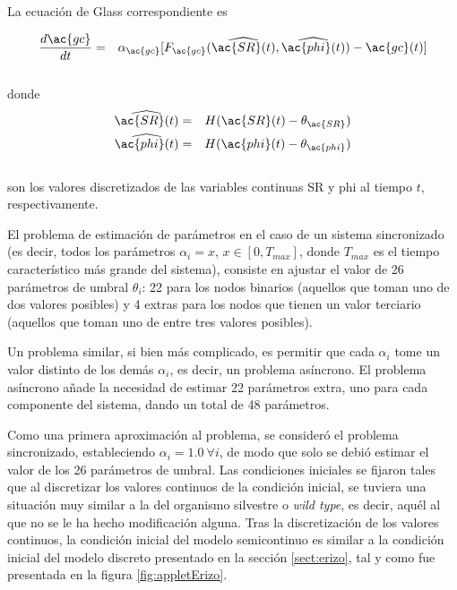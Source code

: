 La ecuación de Glass correspondiente es

\begin{eqnarray}\label{eqn:glasscGMP}
\frac{d\ac{gc}}{dt} & = & \alpha_{\ac{gc}} [F_{\ac{gc}}(\widehat{\ac{SR}(t)}, \widehat{\ac{phi}(t)}) - \ac{gc}(t)]
\end{eqnarray}
\\
donde
\begin{eqnarray}
\widehat{\ac{SR}(t)} & = & H(\ac{SR}(t) - \theta_{\ac{SR}})\\
\widehat{\ac{phi}(t)} & = & H(\ac{phi}(t) - \theta_{\ac{phi}})
\end{eqnarray}
\\
son los valores discretizados de las variables continuas \acf{SR} y \acf{phi} al tiempo $t$, respectivamente.

El problema de estimación de parámetros en el caso de un sistema sincronizado (es decir, todos los parámetros $\alpha_i=x$, $x \in [0,T_{max}]$, donde $T_{max}$ es el tiempo característico más grande del sistema), consiste en ajustar el valor de 26 parámetros de umbral $\theta_i$: 22 para los nodos binarios (aquellos que toman uno de dos valores posibles) y 4 extras para los nodos que tienen un valor terciario (aquellos que toman uno de entre tres valores posibles).

Un problema similar, si bien más complicado, es permitir que cada $\alpha_i$ tome un valor distinto de los demás $\alpha_i$, es decir, un problema asíncrono. El problema asíncrono añade la necesidad de estimar 22 parámetros extra, uno para cada componente del sistema, dando un total de 48 parámetros.

Como una primera aproximación al problema, se consideró el problema sincronizado, estableciendo $\alpha_i = 1.0\ \forall i$, de modo que solo se debió estimar el valor de los 26 parámetros de umbral. Las condiciones iniciales se fijaron tales que al discretizar los valores continuos de la condición inicial, se tuviera una situación muy similar a la del organismo silvestre o \emph{wild type}, es decir, aquél al que no se le ha hecho modificación alguna. Tras la discretización de los valores continuos, la condición inicial del modelo semicontinuo es similar a la condición inicial del modelo discreto presentado en la sección \ref{sect:erizo}, tal y como fue presentada en la figura \ref{fig:appletErizo}.

